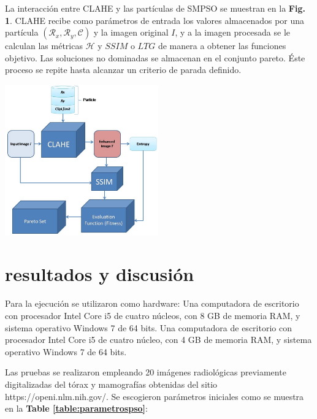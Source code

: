 \documentclass[spanish,twocolumn]{article}
\begin{document}
{La interacción entre CLAHE y las partículas de SMPSO se muestran en la \textbf{Fig. 1}. CLAHE recibe como parámetros de entrada los valores almacenados por una partícula $(\mathcal{R}_x,\mathcal{R}_y, \mathscr{C})$ y la imagen original $I$, y a la imagen procesada se le calculan las métricas $\mathscr{H}$ y $SSIM$  o $LTG$ de manera a obtener las funciones objetivo. Las soluciones no dominadas se almacenan en el conjunto pareto. Éste proceso se repite hasta alcanzar un criterio de parada definido.

 \begin{minipage}[b]{1.0\linewidth}
   \vspace{0.5cm}
   \centering
   \centerline{\includegraphics[height=6.5cm]{Figures/particula_clahe2.jpg}}
   \vspace{0.5cm}
   \label{fig:particula_clahe}
 \end{minipage}


\section{resultados y discusión}
\label{sec:resultadosdiscusion}

Para la ejecución se utilizaron como hardware:
Una computadora de escritorio con procesador Intel Core i5 de cuatro núcleos, con 8 GB de memoria RAM, y sistema operativo Windows 7 de 64 bits. 
Una computadora de escritorio con procesador Intel Core i5 de cuatro núcleo, con 4 GB de memoria RAM, y sistema operativo Windows 7 de 64 bits.

Las pruebas se realizaron empleando {\color{red} 20} imágenes radiológicas previamente digitalizadas del tórax y mamografías obtenidas del sitio https://openi.nlm.nih.gov/. Se escogieron parámetros iniciales como se muestra en la \textbf{Table \ref{table:parametrospso}}:

}
\end{document}

